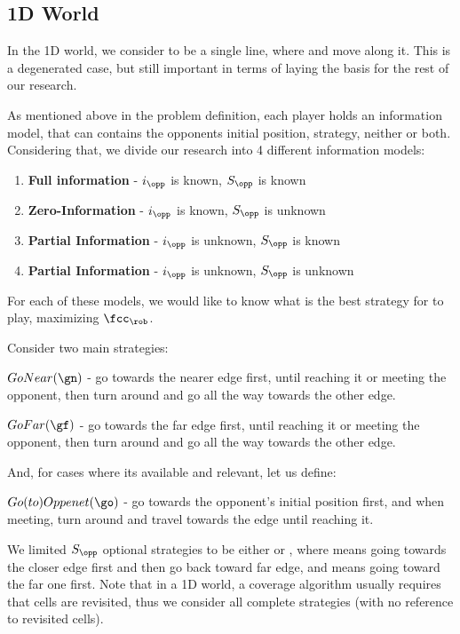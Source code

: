 \documentclass[a4paper,english,10pt]{article}
\begin{document}
\subsection{1D World} \label{sections:1D intro}
In the 1D world, we consider \w to be a single line, where \rob and \opp move along it. This is a degenerated case, but still important in terms of laying the basis for the rest of our research.

As mentioned above in the problem definition, each player holds an information model, that can contains the opponents initial position, strategy, neither or both. Considering that, we divide our research into 4 different information models:
\begin{enumerate}
\item \textbf{Full information} - $i_\opp$ is known, $S_\opp$ is known
\item \textbf{Zero-Information} - $i_\opp$ is known, $S_\opp$ is unknown
\item \textbf{Partial Information} -  $i_\opp$ is unknown, $S_\opp$ is known
\item \textbf{Partial Information} - $i_\opp$ is unknown, $S_\opp$ is unknown
\end{enumerate}

For each of these models, we would like to know what is the best strategy for \rob to play, maximizing $\fcc_\rob$.

Consider two main strategies:

$GoNear(\gn)$ - go towards the nearer edge first, until reaching it or meeting the opponent, then turn around and go all the way towards the other edge.

$GoFar(\gf)$ - go towards the far edge first, until reaching it or meeting the opponent, then turn around and go all the way towards the other edge.

And, for cases where its available and relevant, let us define:

$Go(to)Oppenet(\go)$ - go towards the opponent's initial position first, and when meeting, turn around and travel towards the edge until reaching it.

We limited $S_\opp$ optional strategies to be either \gn or \gf, where \gn means going towards the closer edge first and then go back toward far edge, and \gf means going toward the far one first. 
Note that in a 1D world, a coverage algorithm usually requires that cells are revisited, thus we consider all complete strategies (with no reference to revisited cells).
\end{document}

